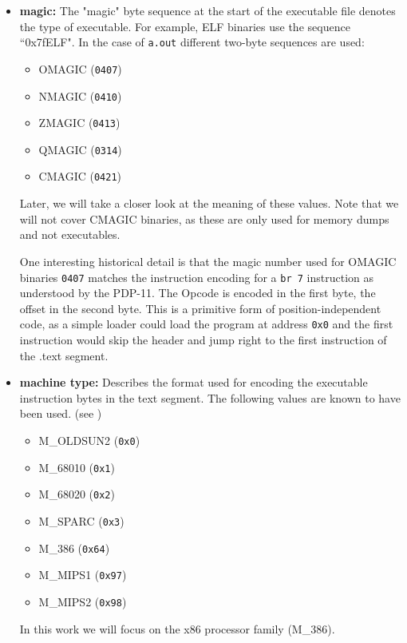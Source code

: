 \documentclass{article}
\begin{document}
\vspace{0.25cm}

\begin{itemize}
\item \textbf{magic:} The "magic" byte sequence at the start of the executable file denotes the type of executable. For example, ELF binaries use the sequence ``0x7fELF"\cite{ElfManPage}. In the case of \texttt{a.out} different two-byte sequences are used\cite[lines 63-74]{AoutHDef}:
  \begin{itemize}
    \item OMAGIC (\texttt{0407}) %
    \item NMAGIC (\texttt{0410})
    \item ZMAGIC (\texttt{0413})
    \item QMAGIC (\texttt{0314})
    \item CMAGIC (\texttt{0421})
  \end{itemize}
Later, we will take a closer look at the meaning of these values. Note that we will not cover CMAGIC binaries, as these are only used for memory dumps and not executables.

One interesting historical detail is that the magic number used for OMAGIC binaries \texttt{0407} matches the instruction encoding for a \texttt{br 7} instruction as understood by the PDP-11\cite[page 4-37]{PDP1140Handbook}. The Opcode is encoded in the first byte, the offset in the second byte. This is a primitive form of position-independent code, as a simple loader could load the program at address \texttt{0x0} and the first instruction would skip the header and jump right to the first instruction of the .text segment\cite[page 51, footnote 1]{Levine}.

\item \textbf{machine type:} Describes the format used for encoding the executable instruction bytes in the text segment. The following values are known to have been used. (see \cite{AoutHDef})
  \begin{itemize}
   \item M\_OLDSUN2 (\texttt{0x0})
   \item M\_68010 (\texttt{0x1})
   \item M\_68020 (\texttt{0x2})
   \item M\_SPARC (\texttt{0x3})
   \item M\_386 (\texttt{0x64})
   \item M\_MIPS1 (\texttt{0x97})
   \item M\_MIPS2 (\texttt{0x98})
  \end{itemize}
In this work we will focus on the x86 processor family (M\_386).


\end{itemize}
\end{document}
